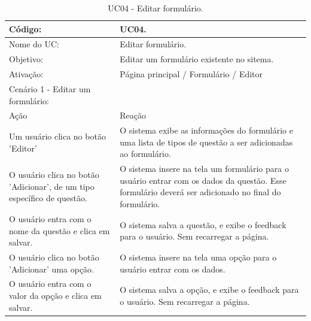 \documentclass[11pt]{article}
\begin{document}
        \begin{table}[h]
          \begin{center}
            \begin{tabular}{ | p{7cm} | p{8cm} | }
              \hline
              Código: \cellcolor{gray} & UC04. \\
              \hline
              Nome do UC: \cellcolor{gray} & Editar formulário. \\
              \hline
              Objetivo: \cellcolor{gray} & Editar um formulário existente no sitema. \\
              \hline
              Ativação: \cellcolor{gray} & Página principal / Formulário / Editor \\
              \hline
              \hline
              Cenário 1 - Editar um formulário: &  \\
              \hline
              Ação\cellcolor{gray} & Reação\cellcolor{gray} \\
              \hline
              Um usuário clica no botão 'Editor' & O sistema exibe as informações do formulário e uma lista de tipos de questão a ser adicionadas ao formulário. \\
              \hline
              O usuário clica no botão 'Adicionar', de um tipo específico de questão. & O sistema insere na tela um formulário para o usuário entrar com os dados da questão. Esse formulário deverá ser adicionado no final do formulário. \\
              \hline
              O usuário entra com o nome da questão e clica em salvar. & O sistema salva a questão, e exibe o feedback para o usuário. Sem recarregar a página. \\
              \hline
              O usuário clica no botão 'Adicionar' uma opção. & O sistema insere na tela uma opção para o usuário entrar com os dados. \\
              \hline
              O usuário entra com o valor da opção e clica em salvar. & O sistema salva a opção, e exibe o feedback para o usuário. Sem recarregar a página. \\
              \hline
            \end{tabular}
            \caption{UC04 - Editar formulário.}
          \end{center}
        \end{table}
        
\end{document}
